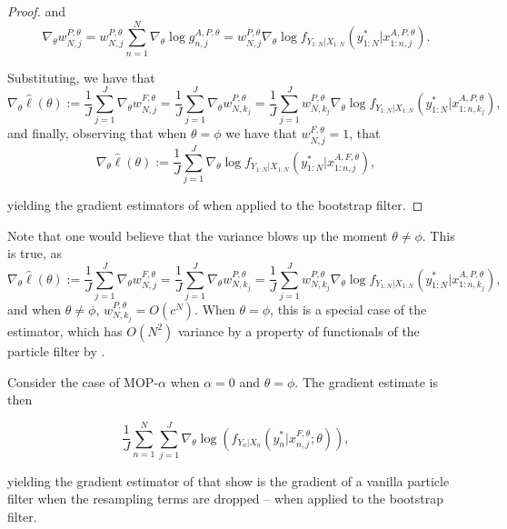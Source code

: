 \documentclass{article}
\begin{document}
\begin{proof}
and 
$$\nabla_\theta w_{N,j}^{P,\theta} = w_{N,j}^{P,\theta} \sum_{n=1}^N \nabla_\theta \log g_{n,j}^{A,P,\theta} = w_{N,j}^{P,\theta} \nabla_\theta \log f_{Y_{1:N}|X_{1:N}}\left(y_{1:N}^* | x_{1:n,j}^{A, P,\theta}\right).$$

Substituting, we have that
\begin{equation*}
    \nabla_\theta \hat{\ell}(\theta) := \frac{1}{J}\sum_{j=1}^J \nabla_\theta w_{N,j}^{F,\theta} =\frac{1}{J}\sum_{j=1}^J \nabla_\theta w_{N,k_j}^{P,\theta} = \frac{1}{J}\sum_{j=1}^J w_{N,k_j}^{P,\theta} \nabla_\theta \log f_{Y_{1:N}|X_{1:N}}\left(y_{1:N}^* | x_{1:n,k_j}^{A, P,\theta}\right),
\end{equation*}
and finally, observing that when $\theta=\phi$ we have that $w_{N,j}^{F,\theta}=1$, that 
\begin{equation*}
    \nabla_\theta \hat{\ell}(\theta) := \frac{1}{J}\sum_{j=1}^J \nabla_\theta \log f_{Y_{1:N}|X_{1:N}}\left(y_{1:N}^* | x_{1:n,j}^{A, F,\theta}\right),
\end{equation*}

yielding the gradient estimators of \cite{poyiadjis11, scibior2021dpf} when applied to the bootstrap filter. 
\end{proof}

Note that one would believe that the variance blows up the moment $\theta\neq\phi$. This is true, as 
\begin{equation*}
    \nabla_\theta \hat{\ell}(\theta) := \frac{1}{J}\sum_{j=1}^J \nabla_\theta w_{N,j}^{F,\theta} =\frac{1}{J}\sum_{j=1}^J \nabla_\theta w_{N,k_j}^{P,\theta} = \frac{1}{J}\sum_{j=1}^J w_{N,k_j}^{P,\theta} \nabla_\theta \log f_{Y_{1:N}|X_{1:N}}\left(y_{1:N}^* | x_{1:n,k_j}^{A, P,\theta}\right),
\end{equation*}
and when $\theta\neq\phi$, $w_{N,k_j}^{P,\theta} = O(c^N)$. When $\theta=\phi$, this is a special case of the \cite{poyiadjis11} estimator, which has $O(N^2)$ variance by a property of functionals of the particle filter by \cite{delMoral03}. 

\begin{lem}
\label{lem:mop-0-formula}

Consider the case of MOP-$\alpha$ when $\alpha=0$ and $\theta=\phi$. The gradient estimate is then

    \begin{equation}
        \frac{1}{J} \sum_{n=1}^N \sum_{j=1}^J \nabla_\theta \log\left(f_{Y_n|X_{n}}(y_n^*|x_{n,j}^{F, \theta}; \theta)\right),
    \end{equation}

    yielding the gradient estimator of \cite{blei2018vsmc} that \cite{scibior2021dpf} show is the gradient of a vanilla particle filter when the resampling terms are dropped -- when applied to the bootstrap filter.

\end{lem}
\end{document}
